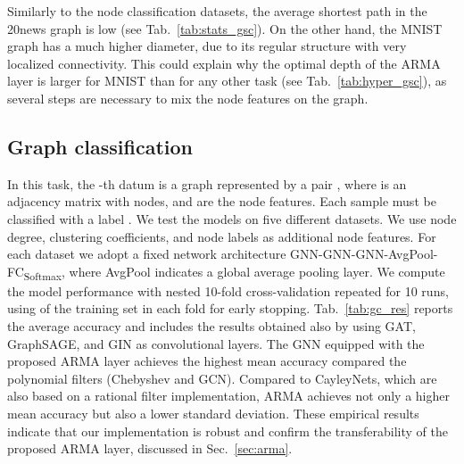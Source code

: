 \documentclass{article}
\begin{document}
Similarly to the node classification datasets, the average shortest path in the 20news graph is low (see Tab.~\ref{tab:stats_gsc}).
On the other hand, the MNIST graph has a much higher diameter, due to its regular structure with very localized connectivity.
This could explain why the optimal depth  of the ARMA layer is larger for MNIST than for any other task (see Tab.~\ref{tab:hyper_gsc}), as several steps are necessary to mix the node features on the graph.

\subsection{Graph classification}
In this task, the -th datum is a graph represented by a pair , where  is an adjacency matrix with  nodes, and  are the node features.
Each sample must be classified with a label .
We test the models on five different datasets.
We use node degree, clustering coefficients, and node labels as additional node features.
For each dataset we adopt a fixed network architecture GNN-GNN-GNN-AvgPool-FC\textsubscript{Softmax}, where AvgPool indicates a global average pooling layer.
We compute the model performance with nested 10-fold cross-validation repeated for 10 runs, using  of the training set in each fold for early stopping. 
Tab.~\ref{tab:gc_res} reports the average accuracy and includes the results obtained also by using GAT, GraphSAGE, and GIN as convolutional layers.
The GNN equipped with the proposed ARMA layer achieves the highest mean accuracy compared the polynomial filters (Chebyshev and GCN).
Compared to CayleyNets, which are also based on a rational filter implementation, ARMA achieves not only a higher mean accuracy but also a lower standard deviation.
These empirical results indicate that our implementation is robust and confirm the transferability of the proposed ARMA layer, discussed in Sec.~\ref{sec:arma}.
\end{document}
